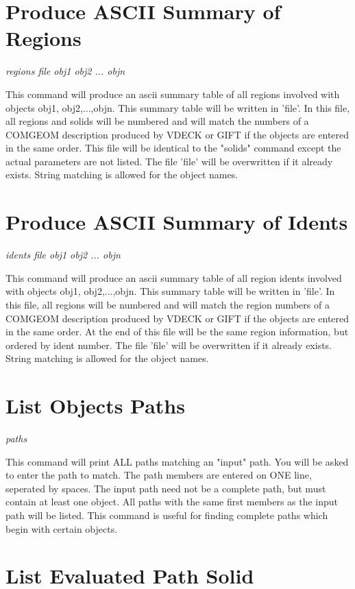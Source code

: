 \section{Produce ASCII Summary of Regions}

{\em \center
regions file obj1 obj2 ... objn
}

This command will produce an ascii summary table of all regions involved with
objects obj1, obj2,...,objn.
This summary table will be written in 'file'.
In this file, all regions and solids will be numbered and will match the numbers
of a COMGEOM description produced by VDECK or GIFT if the objects are entered
in the same order.
This file will be identical to the "solids" command except the actual
parameters are not listed.
The file 'file' will be overwritten if it already exists.
String matching is allowed for the object names.

\section{Produce ASCII Summary of Idents}

{\em \center
idents file obj1 obj2 ... objn
}

This command will produce an ascii summary table of all region idents involved with
objects obj1, obj2,...,objn.
This summary table will be written in 'file'.
In this file, all regions will be numbered and will match the region numbers
of a COMGEOM description produced by VDECK or GIFT if the objects are entered
in the same order.
At the end of this file will be the same region information, but ordered
by ident number.
The file 'file' will be overwritten if it already exists.
String matching is allowed for the object names.

\section{List Objects Paths}

{\em \center
paths
}

This command will print ALL paths matching an "input" path.
You will be asked to enter the path to match.
The path members are entered on ONE line, seperated by spaces.
The input path need not be a complete path, but must contain at least one object.
All paths with the same first members as the input path will be listed.
This command is useful for finding complete paths which begin with certain objects.

\section{List Evaluated Path Solid}

